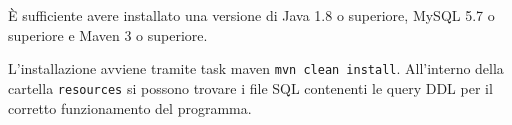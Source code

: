 È sufficiente avere installato una versione di Java 1.8 o superiore, MySQL 5.7 o superiore e Maven 3 o superiore.

L'installazione avviene tramite task maven \texttt{mvn clean install}.
All'interno della cartella \texttt{resources} si possono trovare i file SQL contenenti le query DDL per il corretto funzionamento del programma.